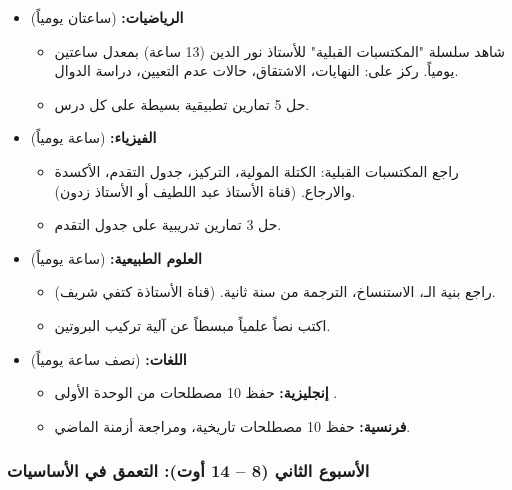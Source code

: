 \documentclass[12pt,a4paper]{book}
\begin{document}
	\begin{itemize}
		\item \textbf{الرياضيات:} (ساعتان يومياً)
		\begin{itemize}
			\item شاهد سلسلة "المكتسبات القبلية" للأستاذ نور الدين (13 ساعة) بمعدل ساعتين يومياً. ركز على: النهايات، الاشتقاق، حالات عدم التعيين، دراسة الدوال.
			\item حل 5 تمارين تطبيقية بسيطة على كل درس.
		\end{itemize}
		\item \textbf{الفيزياء:} (ساعة يومياً)
		\begin{itemize}
			\item راجع المكتسبات القبلية: الكتلة المولية، التركيز، جدول التقدم، الأكسدة والارجاع. (قناة الأستاذ عبد اللطيف أو الأستاذ زدون).
			\item حل 3 تمارين تدريبية على جدول التقدم.
		\end{itemize}
		\item \textbf{العلوم الطبيعية:} (ساعة يومياً)
		\begin{itemize}
			\item راجع بنية الـ، الاستنساخ، الترجمة من سنة ثانية. (قناة الأستاذة كتفي شريف).
			\item اكتب نصاً علمياً مبسطاً عن آلية تركيب البروتين.
		\end{itemize}
		\item \textbf{اللغات:} (نصف ساعة يومياً)
		\begin{itemize}
			\item \textbf{إنجليزية:} حفظ 10 مصطلحات من الوحدة الأولى .
			\item \textbf{فرنسية:} حفظ 10 مصطلحات تاريخية، ومراجعة أزمنة الماضي.
		\end{itemize}
	\end{itemize}
	
	\subsubsection{الأسبوع الثاني (8 – 14 أوت): التعمق في الأساسيات}
	
\end{document}
